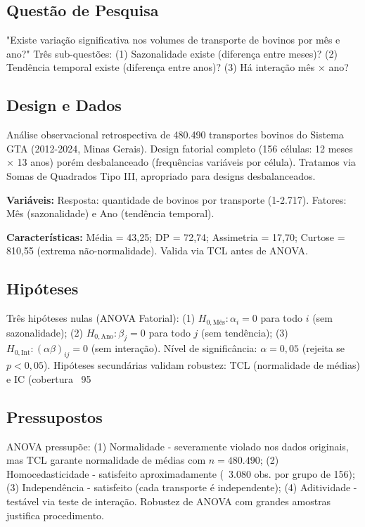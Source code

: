 \documentclass[12pt,a4paper]{article}
\begin{document}
\subsection{Questão de Pesquisa}

"Existe variação significativa nos volumes de transporte de bovinos por mês e ano?" Três sub-questões: (1) Sazonalidade existe (diferença entre meses)? (2) Tendência temporal existe (diferença entre anos)? (3) Há interação mês × ano?

\subsection{Design e Dados}

Análise observacional retrospectiva de 480.490 transportes bovinos do Sistema GTA (2012-2024, Minas Gerais). Design fatorial completo (156 células: 12 meses × 13 anos) porém desbalanceado (frequências variáveis por célula). Tratamos via Somas de Quadrados Tipo III, apropriado para designs desbalanceados.

\textbf{Variáveis:} Resposta: quantidade de bovinos por transporte (1-2.717). Fatores: Mês (sazonalidade) e Ano (tendência temporal).

\textbf{Características:} Média = 43,25; DP = 72,74; Assimetria = 17,70; Curtose = 810,55 (extrema não-normalidade). Valida via TCL antes de ANOVA.

\subsection{Hipóteses}

Três hipóteses nulas (ANOVA Fatorial): (1) $H_{0,\text{Mês}}: \alpha_i = 0$ para todo $i$ (sem sazonalidade); (2) $H_{0,\text{Ano}}: \beta_j = 0$ para todo $j$ (sem tendência); (3) $H_{0,\text{Int}}: (\alpha\beta)_{ij} = 0$ (sem interação). Nível de significância: $\alpha = 0,05$ (rejeita se $p < 0,05$). Hipóteses secundárias validam robustez: TCL (normalidade de médias) e IC (cobertura ~95%

\subsection{Pressupostos}

ANOVA pressupõe: (1) Normalidade - severamente violado nos dados originais, mas TCL garante normalidade de médias com $n = 480.490$; (2) Homocedasticidade - satisfeito aproximadamente (~3.080 obs. por grupo de 156); (3) Independência - satisfeito (cada transporte é independente); (4) Aditividade - testável via teste de interação. Robustez de ANOVA com grandes amostras justifica procedimento.
\end{document}
